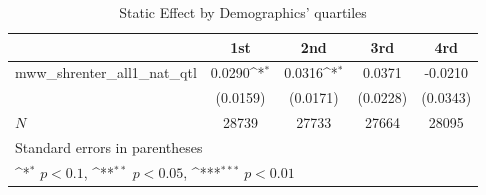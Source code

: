 \begin{table}[htbp]\centering
\def\sym#1{\ifmmode^{#1}\else\(^{#1}\)\fi}
\caption{Static Effect by Demographics' quartiles}
\begin{tabular}{l*{4}{c}}
\hline\hline
            &\multicolumn{1}{c}{1st}&\multicolumn{1}{c}{2nd}&\multicolumn{1}{c}{3rd}&\multicolumn{1}{c}{4rd}\\
\hline
mww\_shrenter\_all1\_nat\_qtl&      0.0290\sym{*}  &      0.0316\sym{*}  &      0.0371         &     -0.0210         \\
            &    (0.0159)         &    (0.0171)         &    (0.0228)         &    (0.0343)         \\
\hline
\(N\)       &       28739         &       27733         &       27664         &       28095         \\
\hline\hline
\multicolumn{5}{l}{\footnotesize Standard errors in parentheses}\\
\multicolumn{5}{l}{\footnotesize \sym{*} \(p<0.1\), \sym{**} \(p<0.05\), \sym{***} \(p<0.01\)}\\
\end{tabular}
\end{table}
